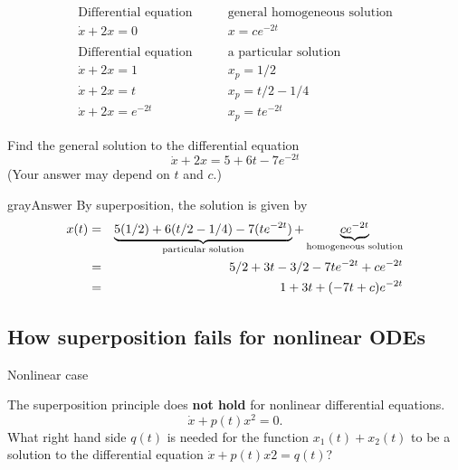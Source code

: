 \begin{align*}
  \text{Differential equation} \qquad & \text{general homogeneous solution} \\
  \dot x + 2x = 0 \qquad & x = ce^{-2t} \\
     \\
  \text{Differential equation} \qquad & \text{a particular solution} \\
  \dot x + 2x = 1 \qquad & x_ p = 1/2 \\
  \dot x + 2x = t \qquad & x_ p = t/2-1/4 \\
  \dot x + 2x = e^{-2t}  \qquad & x_ p = te^{-2t}            
\end{align*}

Find the general solution to the differential equation
\begin{equation*}
  \dot x + 2x = 5 + 6t -7e^{-2t}
\end{equation*}
(Your answer may depend on $t$ and $c$.)

\begin{mybox}{gray}{Answer}
  By superposition, the solution is given by
  \begin{eqnarray*}
    \displaystyle  \displaystyle x(t)
    &=& \displaystyle  \underbrace{5(1/2) + 6(t/2-1/4) - 7(te^{-2t})}_{\text {particular solution}}
        + \underbrace{ce^{-2t}}_{\text {homogeneous solution}} \\
    &=& \displaystyle  5/2 + 3t - 3/2 - 7te^{-2t} + ce^{-2t} \\
    &=& \displaystyle  1+3t + (-7t+c)e^{-2t}
  \end{eqnarray*}
\end{mybox}
\clearpage
\subsection{How superposition fails for nonlinear ODEs}

\begin{exercise}
  Nonlinear case
\end{exercise}
The superposition principle does \textbf{not hold} for nonlinear differential equations.
\begin{equation*}
  \dot x + p(t) x^2 = 0.
\end{equation*}
What right hand side $q(t)$ is needed for the function $x_1(t) + x_2(t)$ to be a solution
to the differential equation $\dot{x} + p(t)x2 = q(t)$?


